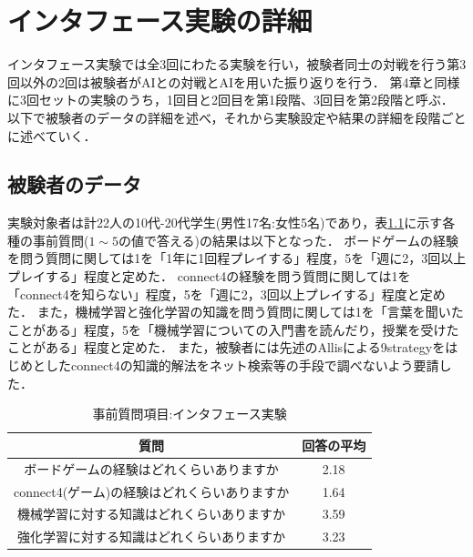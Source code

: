 \chapter{インタフェース実験の詳細}
\label{chap:system}
インタフェース実験では全3回にわたる実験を行い，被験者同士の対戦を行う第3回以外の2回は被験者がAIとの対戦とAIを用いた振り返りを行う．
第4章と同様に3回セットの実験のうち，1回目と2回目を第1段階、3回目を第2段階と呼ぶ．
以下で被験者のデータの詳細を述べ，それから実験設定や結果の詳細を段階ごとに述べていく．
\section{被験者のデータ}
実験対象者は計22人の10代-20代学生(男性17名:女性5名)であり，表\ref{table:before}に示す各種の事前質問($1\sim5$の値で答える)の結果は以下となった．
ボードゲームの経験を問う質問に関しては1を「1年に1回程プレイする」程度，5を「週に2，3回以上プレイする」程度と定めた．
connect4の経験を問う質問に関しては1を「connect4を知らない」程度，5を「週に2，3回以上プレイする」程度と定めた．
また，機械学習と強化学習の知識を問う質問に関しては1を「言葉を聞いたことがある」程度，5を「機械学習についての入門書を読んだり，授業を受けたことがある」程度と定めた．
また，被験者には先述のAllis\cite{allis}による9strategyをはじめとしたconnect4の知識的解法をネット検索等の手段で調べないよう要請した．
\begin{table}[H]
    \caption{事前質問項目:インタフェース実験}
    \label{table:before}
	\small
    \begin{tabular}{c||c}
        \multicolumn{1}{c}{質問} & 回答の平均\\ \hline \hline
        ボードゲームの経験はどれくらいありますか & 2.18\\
        connect4(ゲーム)の経験はどれくらいありますか& 1.64\\\hline
        機械学習に対する知識はどれくらいありますか& 3.59\\
        強化学習に対する知識はどれくらいありますか& 3.23\\
    \end{tabular}
    
\end{table}
